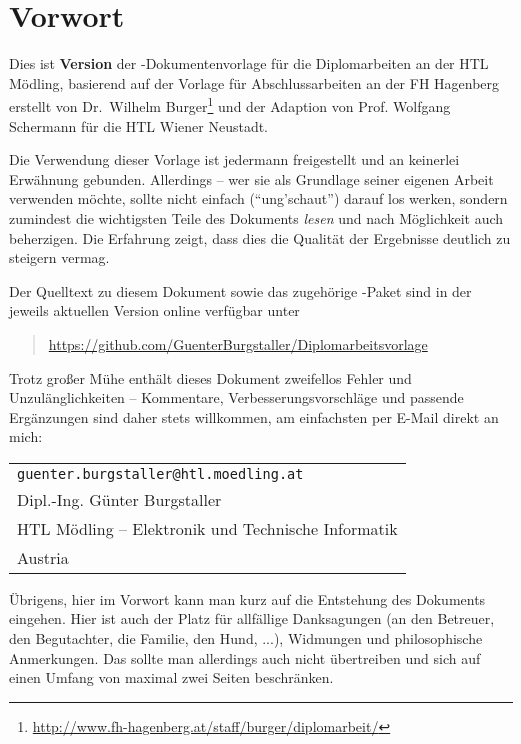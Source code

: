 \chapter{Vorwort}

Dies ist \textbf{Version \htldiplDate} der \latex-Dokumentenvorlage für 
die Diplomarbeiten an der HTL Mödling, basierend auf der
Vorlage für Abschlussarbeiten an der FH Hagenberg erstellt von Dr.\ Wilhelm
Burger\footnote{\url{http://www.fh-hagenberg.at/staff/burger/diplomarbeit/}} und der Adaption von Prof. Wolfgang Schermann für die HTL Wiener Neustadt.

Die Verwendung dieser Vorlage ist jedermann freigestellt und an
keinerlei Erwähnung gebunden. Allerdings -- wer sie als Grundlage
seiner eigenen Arbeit verwenden möchte, sollte nicht einfach
("`ung'schaut"') darauf los werken, sondern zumindest die
wichtigsten Teile des Dokuments \emph{lesen} und nach Möglichkeit
auch beherzigen. Die Erfahrung zeigt, dass dies die Qualität der
Ergebnisse deutlich zu steigern vermag.

Der Quelltext zu diesem Dokument sowie das zugehörige
\latex-Paket sind in der jeweils aktuellen Version online
verfügbar unter
%
\begin{quote}
\url{https://github.com/GuenterBurgstaller/Diplomarbeitsvorlage}
\end{quote}
%
Trotz großer Mühe enthält dieses Dokument zweifellos Fehler und Unzulänglichkeiten
-- Kommentare, Verbesserungsvorschläge und passende Ergänzungen
sind daher stets willkommen, am einfachsten per E-Mail direkt an mich:
\begin{center}%
\begin{tabular}{l}
\nolinkurl{guenter.burgstaller@htl.moedling.at} \\
Dipl.-Ing. Günter Burgstaller\\
HTL Mödling -- Elektronik und Technische Informatik\\
Austria
\end{tabular}
\end{center}

\noindent
Übrigens, hier im Vorwort kann man kurz auf die Entstehung  des Dokuments eingehen.
Hier ist auch der Platz für allfällige Danksagungen (\zB an den Betreuer, 
den Begutachter, die Familie, den Hund, ...), Widmungen und philosophische 
Anmerkungen. Das sollte man allerdings auch nicht übertreiben und sich auf 
einen Umfang von maximal zwei Seiten beschränken.




